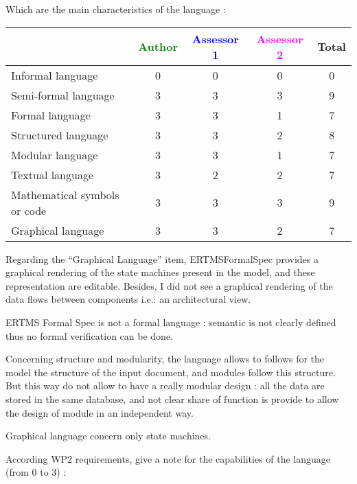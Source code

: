 Which are the main characteristics of the language :

\begin{tabular}{|l | c | c | c | c|}
\hline
& \textcolor{green}{Author} & \textcolor{blue}{Assessor 1} & \textcolor{magenta}{Assessor 2} & Total \\
\hline 
Informal language & 0 & 0 & 0 & 0 \\
\hline 
Semi-formal language & 3 & 3 & 3 & 9 \\
\hline
Formal language & 3 & 3 & 1 & 7 \\
\hline
Structured language & 3 & 3 & 2 & 8 \\
\hline 
Modular language & 3 & 3 & 1 & 7 \\
\hline
Textual language & 3 & 2 & 2 & 7 \\
\hline
Mathematical symbols or code & 3 & 3 & 3 & 9 \\
\hline
Graphical language & 3 & 3 & 2 & 7 \\
\hline
\end{tabular}

\begin{assessor1}
Regarding the "`Graphical Language"' item, ERTMSFormalSpec provides a graphical rendering of the state machines present in the model, and these representation are editable. Besides, I did not see a graphical rendering of the data flows between components i.e.: an architectural view. 
\end{assessor1}


\begin{assessor2}
ERTMS Formal Spec is not a formal language :  semantic is not clearly defined thus no formal verification can be done.

Concerning structure and modularity, the language allows to follows for the model the structure of the input document, and modules follow this structure. But this way do not allow to have a really modular design :  all the data are stored in the same database, and not clear share of function is provide to allow the design of module in an independent way.

Graphical language concern only state machines.
\end{assessor2}

According WP2 requirements, give a note for the capabilities of the language (from 0 to 3) :

